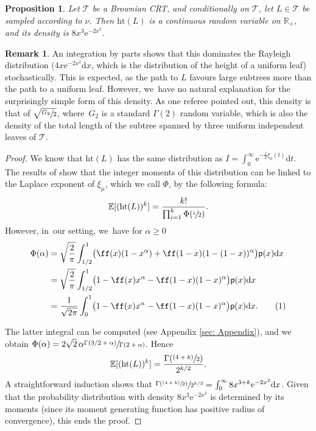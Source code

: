 \documentclass[JEP,XML,SOM,Unicode,NoFloatCountersInSection, NoEqCountersInSection,published]{cedram}
\newcommand{\psfrac}[2]{\sfrac{(#1)}{#2}}
\newcommand{\pp}{\mathsf{p}}
\newcommand{\R}{{\mathbb{R}}}
\newcommand{\T}{\mathcal{T}}\let\CRT\T\let\tbr\T
\newcommand\numberthis{\addtocounter{equation}{1}\tag{\theequation}}
\newcommand{\dd}{\mathrm{d}}
\newcommand{\h}{\mathrm{ht}}
\newtheorem{prop}[thm]{Proposition}
\theoremstyle{definition}
\newtheorem{rem}[thm]{Remark}
\begin{document}
\begin{prop}\label{prop:hd} Let $ \T$ be a Brownian CRT, and conditionally on $\T$, let $ L \in \T$ be sampled according to $\nu$. Then $ \mathrm{ht}(L)$ is a continuous random variable on $\R_+$, and its density is $8x^3\mathrm{e}^{-2x^2}$.
\end{prop}

\begin{rem} An integration by parts shows that this dominates the Rayleigh distribution ($4x\mathrm{e}^{-2x^2} \dd x$, which is the distribution of the height of a uniform leaf) stochastically. This is expected, as the path to $L$ favours large subtrees more than the path to a uniform leaf. However, we~have no natural explanation for the surprisingly simple form of this density. As one referee pointed out, this density is that of $\sqrt{\sfrac{G_2}{2}}$, where~$G_2$ is a standard $\Gamma(2)$ random variable, which is also the density of the total length of the subtree spanned by three uniform independent leaves of $\T$.
\end{rem}

\begin{proof}
We know that $\h(L)$ has the same distribution as $I=\int_{0}^{\infty}\mathrm{e}^{-\frac12 \xi_\mu(t)}\mathrm{d}t$.
The results of \cite{Carmona/Petit/Yor} show that the integer moments of this distribution can be linked to the Laplace exponent of $\xi_\mu$, which we call $\Phi$, by the following formula:
\[
\mathbb{E}[(\mathrm{ht}(L))^k]=\frac{k!}{\prod_{i=1}^k \Phi(\sfrac{i}{2})}.
\]
However, in~our setting, we~have for $\alpha\geq 0$
\begin{align*}\Phi(\alpha)&=\sqrt{\frac{2}{\pi}}\int_{1/2}^{1}\bigl(\ff(x)(1-x^{\alpha})+\ff(1-x)(1-(1-x))^{\alpha}\bigr)\pp(x)\dd x \\
&=\sqrt{\frac{2}{\pi}}\int_{1/2}^{1}\bigl(1-\ff(x)x^{\alpha}-\ff(1-x)(1-x)^{\alpha}\bigr)\pp(x)\dd x\\
&=\frac1{\sqrt{2\pi}}\int_{0}^{1}\bigl(1-\ff(x)x^{\alpha}-\ff(1-x)(1-x)^{\alpha}\bigr)\pp(x)\dd x.\numberthis \label{leafheightintegral}
\end{align*}

The latter integral can be computed (see Appendix \ref{sec: Appendix}), and we obtain $\Phi(\alpha)=2\sqrt{2}\,\alpha\sfrac{\Gamma(3/2+\alpha)}{\Gamma(2+\alpha)}$. Hence
\[
\mathbb{E}[(\mathrm{ht}(L))^k]=\frac{\Gamma(\psfrac{4+k}{2})}{2^{k/2}}.
\]
A straightforward induction shows that $\sfrac{\Gamma(\psfrac{4+k}{2})}{2^{k/2}}=\int_0^{\infty} 8x^{3+k}\mathrm{e}^{-2x^2} \mathrm{d}x$. Given that the probability distribution with density $8x^3\mathrm{e}^{-2x^2}$ is determined by its moments (since its moment generating function has positive radius of convergence), this ends the proof.
\end{proof}
\end{document}
